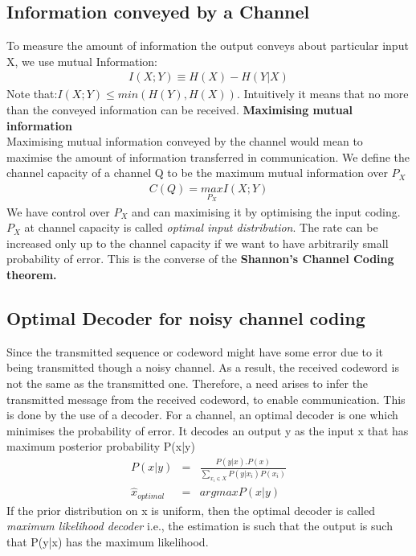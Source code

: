 \documentclass[10pt,twocolumn,letterpaper]{article}
\begin{document}
\subsection{Information conveyed by a Channel}
    To measure the amount of information the output conveys about particular input X, we use mutual Information:
    \begin{eqnarray*}
        I(X;Y)\equiv H(X)-H(Y|X)
    \end{eqnarray*}
    Note that:$I(X;Y)\leq min(H(Y),H(X))$. Intuitively it means that no more than the conveyed information can be received.
    \textbf{Maximising mutual information}\\
    Maximising mutual information conveyed by the channel would mean to maximise the amount of information transferred in communication. We define the channel capacity of a channel Q to be the maximum mutual information over $P_X$
    \begin{eqnarray*}
        C(Q)=\underset{P_X}{max}I(X;Y)
    \end{eqnarray*}
    We have control over $P_X$ and can maximising it by optimising the input coding. $P_X$ at channel capacity is called \textit{optimal input distribution}. The rate can be increased only up to the channel capacity if we want to have arbitrarily small probability of error. This is the converse of the \textbf{Shannon's Channel Coding theorem.}

\subsection{Optimal Decoder for noisy channel coding}
Since the transmitted sequence or codeword might have some error due to it being transmitted  though a noisy channel. As a result, the received codeword is not the same as the transmitted one. Therefore, a need arises to infer the transmitted message from the received codeword, to enable communication. This is done by the use of a decoder.
For a channel, an optimal decoder is one which minimises the probability of error. It decodes an output y as the input x that has maximum posterior probability P(x|y)
\begin{eqnarray*}
    P(x|y)&=&\frac{P(y|x).P(x)}{\sum_{x_i\in X}P(y|x_i)P(x_i)}\\
    \hat{x}_{optimal}&=&argmax P(x|y)
\end{eqnarray*}
If the prior distribution on x is uniform, then the optimal decoder is called \textit{maximum likelihood decoder} i.e., the estimation is such that the output is such that P(y|x) has the maximum likelihood.
\end{document}
